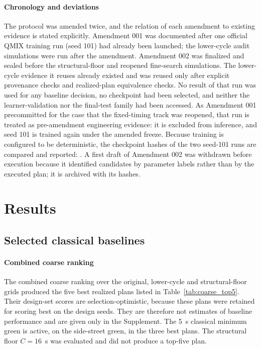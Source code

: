 \documentclass[review,12pt]{elsarticle}
\newcommand{\TBD}[1]{\textcolor{red}{\texttt{\detokenize{#1}}}}
\begin{document}
\paragraph{Chronology and deviations} The protocol was amended twice,
and the relation of each amendment to existing evidence is stated
explicitly.
Amendment 001 was documented after one official QMIX training run (seed
101) had already been launched; the lower-cycle audit simulations were
run after the amendment.
Amendment 002 was finalized and sealed before the structural-floor and
reopened fine-search simulations. The lower-cycle evidence it reuses
already existed and was reused only after explicit provenance checks and
realized-plan equivalence checks. No result of that run was used for any
baseline decision, no checkpoint had been selected, and neither the
learner-validation nor the final-test family had been accessed. As
Amendment 001 precommitted for the case that the fixed-timing track was
reopened, that run is treated as pre-amendment engineering evidence: it
is excluded from inference, and seed 101 is trained again under the
amended freeze. Because training is configured to be deterministic, the
checkpoint hashes of the two seed-101 runs are compared and reported:
\TBD{TBD_AFTER_LEARNER_TRAINING}. A first draft of Amendment 002 was
withdrawn before execution because it identified candidates by
parameter labels rather than by the executed plan; it is archived with
its hashes.

\section{Results}
\label{sec:results}

\subsection{Selected classical baselines}
\label{subsec:res_baselines}
\paragraph{Combined coarse ranking} The combined coarse ranking over
the original, lower-cycle and structural-floor grids produced the five
best realized plans listed in Table~\ref{tab:coarse_top5}. Their
design-set scores are selection-optimistic, because these plans were
retained for scoring best on the design seeds. They are therefore not
estimates of baseline performance and are given only in the Supplement.
The 5~s classical minimum green is active, on the side-street green, in
the three best plans. The structural floor $C=16$~s was evaluated and
did not produce a top-five plan.
\end{document}
